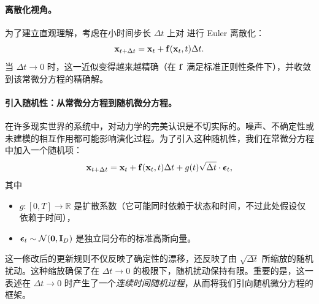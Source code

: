\paragraph{离散化视角。} 为了建立直观理解，考虑在小时间步长 $ \Delta t $ 上对  进行 Euler 离散化：
\begin{equation*}
    {\mathbf{x}}_{t+\Delta t} = {\mathbf{x}}_t + {\mathbf{f}}({\mathbf{x}}_t, t) \Delta t.
\end{equation*}
当 $ \Delta t \to 0 $ 时，这一近似变得越来越精确（在 $ {\mathbf{f}} $ 满足标准正则性条件下），并收敛到该常微分方程的精确解。

\paragraph{引入随机性：从常微分方程到随机微分方程。} 在许多现实世界的系统中，对动力学的完美认识是不切实际的。噪声、不确定性或未建模的相互作用都可能影响演化过程。为了引入这种随机性，我们在常微分方程中加入一个随机项：
\begin{equation}
    {\mathbf{x}}_{t+\Delta t} = {\mathbf{x}}_t + {\mathbf{f}}({\mathbf{x}}_t, t)\Delta t + g(t)\sqrt{\Delta t} \cdot \bm{\epsilon}_t,
    \label{eq:euler-sde}
\end{equation}
其中
\begin{itemize}
    \item $g: [0,T] \to \mathbb{R}$ 是扩散系数（它可能同时依赖于状态和时间，不过此处假设仅依赖于时间），
    \item $\bm{\epsilon}_t \sim \mathcal{N}(\bm{0}, {\mathbf{I}}_D)$ 是独立同分布的标准高斯向量。
\end{itemize}

这一修改后的更新规则不仅反映了确定性的漂移，还反映了由 $ \sqrt{\Delta t} $ 所缩放的随机扰动。这种缩放确保了在 $ \Delta t \to 0 $ 的极限下，随机扰动保持有限。重要的是，这一表述在 $ \Delta t \to 0 $ 时产生了一个\emph{连续时间随机过程}，从而将我们引向随机微分方程的框架。

